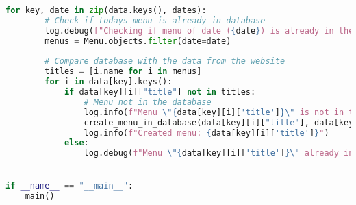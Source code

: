\begin{lstlisting}[language=Python]
    for key, date in zip(data.keys(), dates):
        # Check if todays menu is already in database
        log.debug(f"Checking if menu of date ({date}) is already in the database")
        menus = Menu.objects.filter(date=date)
        
        # Compare database with the data from the website
        titles = [i.name for i in menus]
        for i in data[key].keys():
            if data[key][i]["title"] not in titles:
                # Menu not in the database
                log.info(f"Menu \"{data[key][i]['title']}\" is not in the database")
                create_menu_in_database(data[key][i]["title"], data[key][i]["description"], data[key][i]["label"], date)  # Create the menu
                log.info(f"Created menu: {data[key][i]['title']}")
            else:
                log.debug(f"Menu \"{data[key][i]['title']}\" already in database")


if __name__ == "__main__":
    main()
\end{lstlisting}